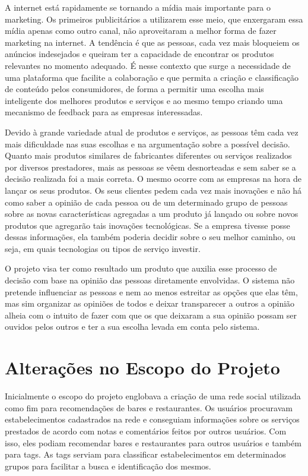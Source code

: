     A internet está rapidamente se tornando a mídia mais importante para o marketing. Os primeiros publicitários a utilizarem esse meio, que enxergaram essa mídia apenas como outro canal, não aproveitaram a melhor forma de fazer marketing na internet. A tendência é que as pessoas, cada vez mais bloqueiem os anúncios indesejados e queiram ter a capacidade de encontrar os produtos relevantes no momento adequado. É nesse contexto que surge a necessidade de uma plataforma que facilite a colaboração e que permita a criação e classificação de conteúdo pelos consumidores, de forma a permitir uma escolha mais inteligente dos melhores produtos e serviços e ao mesmo tempo criando uma mecanismo de feedback para as empresas interessadas.
 
    Devido à grande variedade atual de produtos e serviços, as pessoas têm cada vez mais dificuldade nas suas escolhas e na argumentação sobre a possível decisão. Quanto mais produtos similares de fabricantes diferentes ou serviços realizados por diversos prestadores, mais as pessoas se vêem desnorteadas e sem saber se a decisão realizada foi a mais correta. O mesmo ocorre com as empresas na hora de lançar os seus produtos. Os seus clientes pedem cada vez mais inovações e não há como saber a opinião de cada pessoa ou de um determinado grupo de pessoas sobre as novas características agregadas a um produto já lançado ou sobre novos produtos que agregarão tais inovações tecnológicas. Se a empresa tivesse posse dessas informações, ela também poderia decidir sobre o seu melhor caminho, ou seja, em quais tecnologias ou tipos de serviço investir.
 
    O projeto visa ter como resultado um produto que auxilia esse processo de decisão com base na opinião das pessoas diretamente envolvidas. O sistema não pretende influenciar as pessoas e nem ao menos estreitar as opções que elas têm, mas sim organizar as opiniões de todos e deixar transparecer a outros a opinião alheia com o intuito de fazer com que os que deixaram a sua opinião possam ser ouvidos pelos outros e ter a sua escolha levada em conta pelo sistema.

\section{Alterações no Escopo do Projeto}

    Inicialmente o escopo do projeto englobava a criação de uma rede social utilizada como fim para recomendações de bares e restaurantes. Os usuários procuravam estabelecimentos cadastrados na rede e conseguiam informações sobre os serviços prestados de acordo com notas e comentários feitos por outros usuários. Com isso, eles podiam recomendar bares e restaurantes para outros usuários e também para tags. As tags serviam para classificar estabelecimentos em determinados grupos para facilitar a busca e identificação dos mesmos.
 
